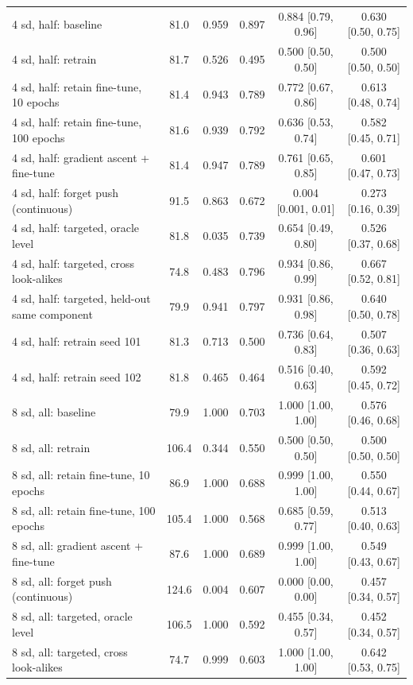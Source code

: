 \begin{tabular}{lccccc}
\midrule
4 sd, half: baseline & 81.0 & 0.959 & 0.897 & 0.884 [0.79, 0.96] & 0.630 [0.50, 0.75] \\
4 sd, half: retrain & 81.7 & 0.526 & 0.495 & 0.500 [0.50, 0.50] & 0.500 [0.50, 0.50] \\
4 sd, half: retain fine-tune, 10 epochs & 81.4 & 0.943 & 0.789 & 0.772 [0.67, 0.86] & 0.613 [0.48, 0.74] \\
4 sd, half: retain fine-tune, 100 epochs & 81.6 & 0.939 & 0.792 & 0.636 [0.53, 0.74] & 0.582 [0.45, 0.71] \\
4 sd, half: gradient ascent + fine-tune & 81.4 & 0.947 & 0.789 & 0.761 [0.65, 0.85] & 0.601 [0.47, 0.73] \\
4 sd, half: forget push (continuous) & 91.5 & 0.863 & 0.672 & 0.004 [0.001, 0.01] & 0.273 [0.16, 0.39] \\
4 sd, half: targeted, oracle level & 81.8 & 0.035 & 0.739 & 0.654 [0.49, 0.80] & 0.526 [0.37, 0.68] \\
4 sd, half: targeted, cross look-alikes & 74.8 & 0.483 & 0.796 & 0.934 [0.86, 0.99] & 0.667 [0.52, 0.81] \\
4 sd, half: targeted, held-out same component & 79.9 & 0.941 & 0.797 & 0.931 [0.86, 0.98] & 0.640 [0.50, 0.78] \\
4 sd, half: retrain seed 101 & 81.3 & 0.713 & 0.500 & 0.736 [0.64, 0.83] & 0.507 [0.36, 0.63] \\
4 sd, half: retrain seed 102 & 81.8 & 0.465 & 0.464 & 0.516 [0.40, 0.63] & 0.592 [0.45, 0.72] \\
\midrule
8 sd, all: baseline & 79.9 & 1.000 & 0.703 & 1.000 [1.00, 1.00] & 0.576 [0.46, 0.68] \\
8 sd, all: retrain & 106.4 & 0.344 & 0.550 & 0.500 [0.50, 0.50] & 0.500 [0.50, 0.50] \\
8 sd, all: retain fine-tune, 10 epochs & 86.9 & 1.000 & 0.688 & 0.999 [1.00, 1.00] & 0.550 [0.44, 0.67] \\
8 sd, all: retain fine-tune, 100 epochs & 105.4 & 1.000 & 0.568 & 0.685 [0.59, 0.77] & 0.513 [0.40, 0.63] \\
8 sd, all: gradient ascent + fine-tune & 87.6 & 1.000 & 0.689 & 0.999 [1.00, 1.00] & 0.549 [0.43, 0.67] \\
8 sd, all: forget push (continuous) & 124.6 & 0.004 & 0.607 & 0.000 [0.00, 0.00] & 0.457 [0.34, 0.57] \\
8 sd, all: targeted, oracle level & 106.5 & 1.000 & 0.592 & 0.455 [0.34, 0.57] & 0.452 [0.34, 0.57] \\
8 sd, all: targeted, cross look-alikes & 74.7 & 0.999 & 0.603 & 1.000 [1.00, 1.00] & 0.642 [0.53, 0.75] \\

\end{tabular}

